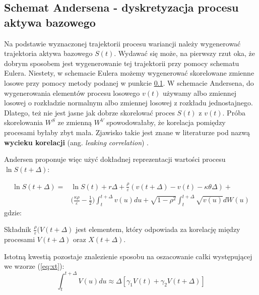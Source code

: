 \documentclass{pracamgr}
\begin{document}
\subsection{Schemat Andersena - dyskretyzacja procesu aktywa bazowego}

Na podstawie wyznaczonej trajektorii procesu wariancji należy wygenerować trajektoria aktywa bazowego 
$S(t)$. Wydawać się może, na pierwszy rzut oka, że dobrym sposobem jest wygenerowanie tej trajektorii 
przy pomocy schematu Eulera. Niestety, w schemacie Eulera możemy wygenerować skorelowane zmienne 
losowe przy pomocy metody podanej w punkcie \ref{}.
W schemacie Andersena, do wygenerowania elementów procesu losowego $v(t)$ używamy albo zmiennej 
losowej o rozkładzie normalnym albo zmiennej losowej z rozkładu jednostajnego. Dlatego, też nie jest 
jasne jak dobrze skorelować proces $S(t)$ z $v(t)$. Próba skorelowania $W^S$ ze zmienną $W^V$
spowodowałaby, że korelacja pomiędzy procesami byłaby zbyt mała. Zjawisko takie jest znane w 
literaturze pod nazwą \textbf{wycieku korelacji} 
(ang. \textit{leaking correlation}) \cite{Andersen}. 

Andersen proponuje więc użyć dokładnej reprezentacji wartości procesu $\ln S(t + \Delta)$:

\begin{equation}
\begin{aligned}
\label{eq:xt}
\ln S(t + \Delta) = & \ln S(t) + r \Delta + \frac{\rho}{\varepsilon} (v(t + \Delta)  - v(t) - \kappa \theta \Delta) + \\
& \Big( \frac{\kappa \rho}{\varepsilon} - \frac{1}{2} \Big)
\int_t^{t+\Delta} v(u) du + \sqrt{1-\rho^2} \int_t^{t+\Delta} \sqrt{v(u)}dW(u)
\end{aligned}
\end{equation}
gdzie:

Składnik $\frac{\rho}{\varepsilon} (V(t + \Delta)$ jest elementem, który odpowiada za korelację między 
procesami $V(t + \Delta)$ oraz $X(t + \Delta)$.

Istotną kwestią pozostaje znalezienie sposobu na oszacowanie całki występującej we wzorze (\ref{eq:xt}):
\begin{equation}
  \int_t^{t+\Delta}  V(u) du \approx \Delta [\gamma_1 V(t) + \gamma_2 V(t + \Delta)]
\end{equation}
\end{document}
